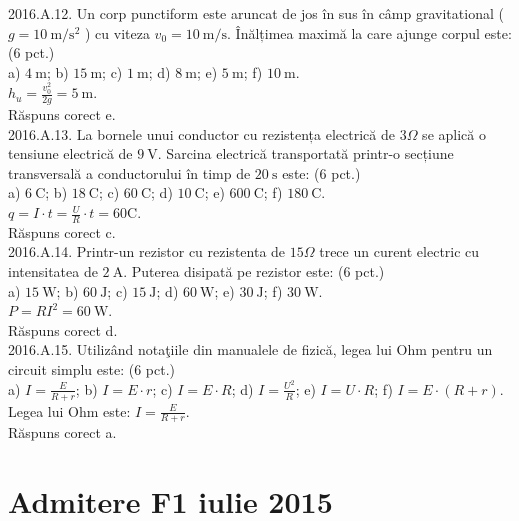 2016.A.12. Un corp punctiform este aruncat de jos în sus în câmp gravitational ( $g=10 \mathrm{~m} / \mathrm{s}^{2}$ ) cu viteza $v_{0}=10 \mathrm{~m} / \mathrm{s}$. Înălțimea maximă la care ajunge corpul este: (6 pct.)\\ a) $4 \mathrm{~m}$; b) $15 \mathrm{~m}$; c) $1 \mathrm{~m}$; d) $8 \mathrm{~m}$; e) $5 \mathrm{~m}$; f) $10 \mathrm{~m}$.\\ $h_{u}=\frac{v_{0}^{2}}{2 g}=5 \mathrm{~m}$.\\ Răspuns corect e.\\

2016.A.13. La bornele unui conductor cu rezistența electrică de $3 \Omega$ se aplică o tensiune electrică de $9 \mathrm{~V}$. Sarcina electrică transportată printr-o secțiune transversală a conductorului în timp de $20 \mathrm{~s}$ este: (6 pct.)\\ a) $6 \mathrm{~C}$; b) $18 \mathrm{~C}$; c) $60 \mathrm{~C}$; d) $10 \mathrm{~C}$; e) $600 \mathrm{~C}$; f) $180 \mathrm{~C}$.\\ $q=I \cdot t=\frac{U}{R} \cdot t=60 \mathrm{C}$.\\ Răspuns corect c.\\

2016.A.14. Printr-un rezistor cu rezistenta de $15 \Omega$ trece un curent electric cu intensitatea de $2 \mathrm{~A}$. Puterea disipată pe rezistor este: (6 pct.)\\ a) $15 \mathrm{~W}$; b) $60 \mathrm{~J}$; c) $15 \mathrm{~J}$; d) $60 \mathrm{~W}$; e) $30 \mathrm{~J}$; f) $30 \mathrm{~W}$.\\ $P=R I^{2}=60 \mathrm{~W}$.\\ Răspuns corect d.\\

2016.A.15. Utilizând notaţiile din manualele de fizică, legea lui Ohm pentru un circuit simplu este: (6 pct.)\\ a) $I=\frac{E}{R+r}$; b) $I=E \cdot r$; c) $I=E \cdot R$; d) $I=\frac{U^{2}}{R}$; e) $I=U \cdot R$; f) $I=E \cdot(R+r)$.\\ Legea lui Ohm este: $I=\frac{E}{R+r}$.\\ Răspuns corect a.\\

\section{Admitere F1 iulie 2015}

